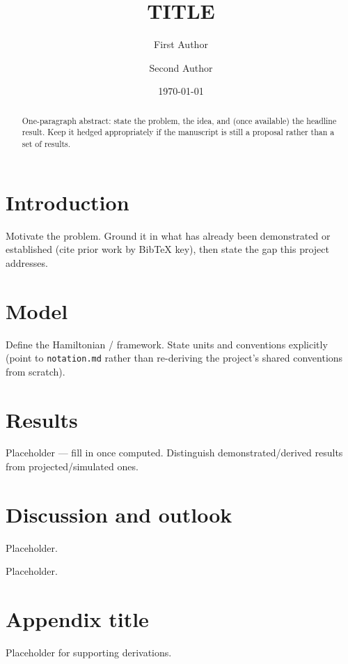 \documentclass[aps,pra,reprint,superscriptaddress,longbibliography]{revtex4-2}
\begin{document}
\title{TITLE}

\author{First Author}
\author{Second Author}

\date{\today}

\begin{abstract}
One-paragraph abstract: state the problem, the idea, and (once available) the headline result.
Keep it hedged appropriately if the manuscript is still a proposal rather than a set of results.
\end{abstract}

\maketitle

\section{Introduction}
Motivate the problem. Ground it in what has already been demonstrated or established (cite prior
work by BibTeX key), then state the gap this project addresses.

\section{Model}
Define the Hamiltonian / framework. State units and conventions explicitly (point to
\texttt{notation.md} rather than re-deriving the project's shared conventions from scratch).

\section{Results}
Placeholder — fill in once computed. Distinguish demonstrated/derived results from
projected/simulated ones.

\section{Discussion and outlook}
Placeholder.

\begin{acknowledgments}
Placeholder.
\end{acknowledgments}

\appendix
\section{Appendix title}
Placeholder for supporting derivations.


\end{document}
